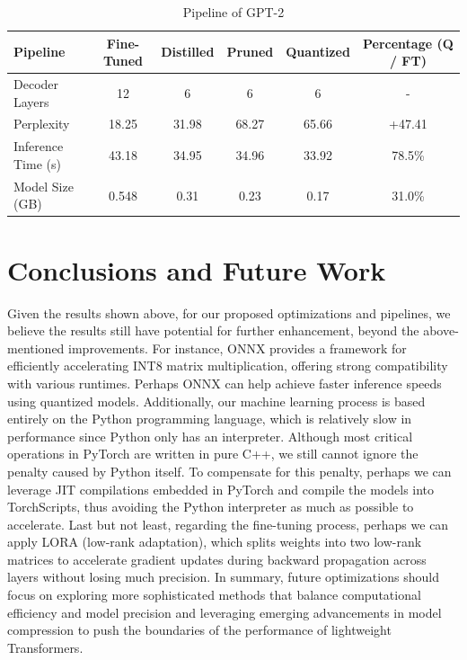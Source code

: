 \documentclass{article}
\begin{document}
    \begin{table}[h!]
        \centering
        \begin{tabular}{lccccc}
            \toprule
            \textbf{Pipeline}       & \textbf{Fine-Tuned} & \textbf{Distilled} & \textbf{Pruned} & \textbf{Quantized}  & \textbf{Percentage (Q / FT)} \\ \midrule
            Decoder Layers        & 12                  & 6                     & 6                & 6  &  -                    \\
            Perplexity      & 18.25               & 31.98                 & 68.27            & 65.66  &  +47.41                 \\
            Inference Time (s)    & 43.18               & 34.95                 & 34.96             & 33.92  &  78.5\%                  \\
            Model Size (GB)       & 0.548                & 0.31                  & 0.23             & 0.17   &  31.0\%                  \\ \bottomrule
        \end{tabular}
        \caption{Pipeline of GPT-2}
        \label{tab:GPT2_pipeline}
    \end{table}


    \section{Conclusions and Future Work}
    \hspace*{1em} Given the results shown above, for our proposed optimizations and pipelines, we believe the results still have potential for further enhancement, beyond the above-mentioned improvements.
    For instance, ONNX provides a framework for efficiently accelerating INT8 matrix multiplication, offering strong compatibility with various runtimes. Perhaps ONNX can help achieve faster inference speeds using quantized models.
    Additionally, our machine learning process is based entirely on the Python programming language, which is relatively slow in performance since Python only has an interpreter. Although most critical operations in PyTorch are written in pure C++, we still cannot ignore the penalty caused by Python itself. To compensate for this penalty, perhaps we can leverage JIT compilations embedded in PyTorch and compile the models into TorchScripts, thus avoiding the Python interpreter as much as possible to accelerate.
    Last but not least, regarding the fine-tuning process, perhaps we can apply LORA (low-rank adaptation), which splits weights into two low-rank matrices to accelerate gradient updates during backward propagation across layers without losing much precision.
    In summary, future optimizations should focus on exploring more sophisticated methods that balance computational efficiency and model precision and leveraging emerging advancements in model compression to push the boundaries of the performance of lightweight Transformers.
\end{document}
